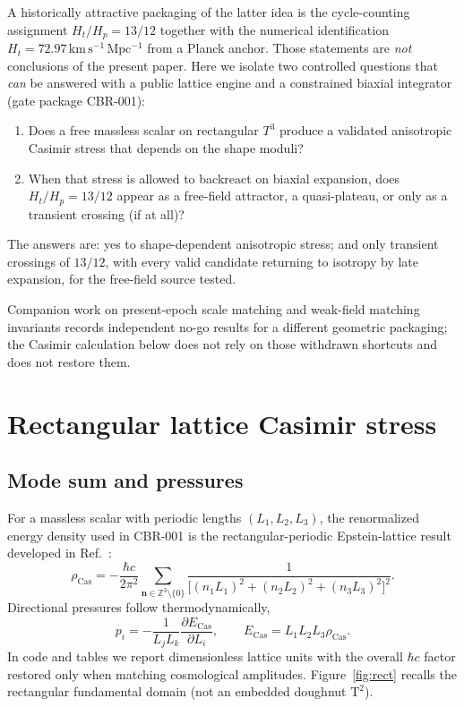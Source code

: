 \documentclass[aps,prd,reprint,superscriptaddress,nofootinbib,floatfix]{revtex4-2}
\newcommand{\Tthree}{T^{3}}
\newcommand{\Ht}{H_{t}}
\newcommand{\Hp}{H_{p}}
\begin{document}
A historically attractive packaging of the latter idea is the cycle-counting
assignment \(\Ht/\Hp=13/12\) together with the numerical identification
\(\Ht=72.97\,\mathrm{km\,s^{-1}\,Mpc^{-1}}\) from a Planck anchor.
Those statements are \emph{not} conclusions of the present paper.
Here we isolate two controlled questions that \emph{can} be answered with a
public lattice engine and a constrained biaxial integrator (gate package
CBR-001):

\begin{enumerate}
\item Does a free massless scalar on rectangular \(\Tthree\) produce a
validated anisotropic Casimir stress that depends on the shape moduli?
\item When that stress is allowed to backreact on biaxial expansion, does
\(\Ht/\Hp=13/12\) appear as a free-field attractor, a quasi-plateau, or only
as a transient crossing (if at all)?
\end{enumerate}

The answers are: yes to shape-dependent anisotropic stress; and only
transient crossings of \(13/12\), with every valid candidate returning to
isotropy by late expansion, for the free-field source tested.

Companion work on present-epoch scale matching and weak-field matching
invariants \cite{boyd_p1} records independent no-go results for a different
geometric packaging; the Casimir calculation below does not rely on those
withdrawn shortcuts and does not restore them.

\section{Rectangular lattice Casimir stress}
\label{sec:lattice}

\subsection{Mode sum and pressures}

For a massless scalar with periodic lengths \((L_1,L_2,L_3)\), the renormalized
energy density used in CBR-001 is the rectangular-periodic Epstein-lattice
result developed in Ref.~\cite{edery2006}:
\begin{equation}
 \rho_{\mathrm{Cas}}=-\frac{\hbar c}{2\pi^2}
 \sum_{\mathbf n\in\mathbb Z^3\setminus\{0\}}
 \frac{1}{\bigl[(n_1L_1)^2+(n_2L_2)^2+(n_3L_3)^2\bigr]^2}.
 \label{eq:casimir-lattice}
\end{equation}
Directional pressures follow thermodynamically,
\begin{equation}
 p_i=-\frac{1}{L_jL_k}\frac{\partial E_{\mathrm{Cas}}}{\partial L_i},
 \qquad E_{\mathrm{Cas}}=L_1L_2L_3\rho_{\mathrm{Cas}}.
 \label{eq:casimir-pressure}
\end{equation}
In code and tables we report dimensionless lattice units with the overall
\(\hbar c\) factor restored only when matching cosmological amplitudes.
Figure~\ref{fig:rect} recalls the rectangular fundamental domain (not an
embedded doughnut \(\mathrm{T}^2\)).
\end{document}

